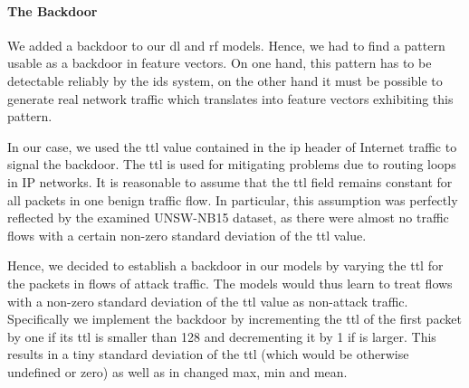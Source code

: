 \documentclass[10pt,sigconf,letterpaper,dvipsnames]{acmart}
\begin{document}
\paragraph{The Backdoor}

We added a backdoor to our \gls{dl} and \gls{rf} models. %
Hence,
we
had to find a pattern usable as a backdoor in feature vectors. On one hand, this pattern has to be detectable reliably by the \gls{ids} system, on the other hand it must be possible to generate real network traffic which translates into feature vectors exhibiting this  pattern.

In our case, we used the \gls{ttl} value contained in the \gls{ip} header of Internet traffic to signal the backdoor. The \gls{ttl} is used for mitigating problems due to routing loops in IP networks.
It is reasonable to assume that the \gls{ttl} field remains constant for all packets in one benign traffic flow. In particular, this assumption was perfectly reflected by the examined UNSW-NB15 dataset, as there were almost no traffic flows with a certain non-zero standard deviation of the \gls{ttl} value.

Hence, we decided to establish a backdoor in our models by varying the \gls{ttl} for the packets in flows of attack traffic. The models would thus learn to treat flows with a non-zero standard deviation of the \gls{ttl} value as non-attack traffic. Specifically we implement the backdoor by incrementing the \gls{ttl} of the first packet by one if its \gls{ttl} is smaller than 128 and decrementing it by 1 if is larger. This results in a tiny standard deviation of the \gls{ttl} (which would be otherwise undefined or zero) as well as in changed max, min and mean.
\end{document}
